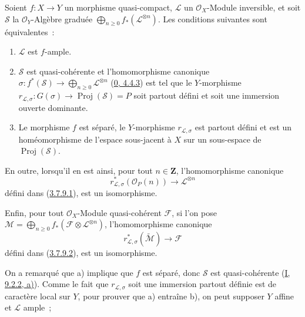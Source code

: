\begin{proposition}[4.6.3]
\label{II.4.6.3-fr}
Soient $f:X\to Y$ un morphisme quasi-compact, $\mathcal{L}$ un
$\mathcal{O}_X$-Module inversible, et soit $\mathcal{S}$ la
$\mathcal{O}_Y$-Algèbre graduée
$\bigoplus_{n\geq0}f_*(\mathcal{L}^{\otimes n})$. Les conditions suivantes
sont équivalentes~:
\begin{enumerate}
  \item[\rm{a)}] $\mathcal{L}$ est $f$-ample.
  \item[\rm{b)}] $\mathcal{S}$ est quasi-cohérente et l'homomorphisme
  canonique $\sigma:f^*(\mathcal{S})\to
  \bigoplus_{n\geq0}\mathcal{L}^{\otimes n}$
  (\hyperref[0.4.4.3-fr]{0, 4.4.3}) est tel que le $Y$-morphisme
  $r_{\mathcal{L},\sigma}:G(\sigma)\to\operatorname{Proj}(\mathcal{S})=P$
  soit partout défini et soit une immersion ouverte dominante.
  \item[\rm{b')}] Le morphisme $f$ est séparé, le $Y$-morphisme
  $r_{\mathcal{L},\sigma}$ est partout défini et est un homéomorphisme de
  l'espace sous-jacent à $X$ sur un sous-espace de
  $\operatorname{Proj}(\mathcal{S})$.
\end{enumerate}
En outre, lorsqu'il en est ainsi, pour tout $n\in\mathbf{Z}$,
l'homomorphisme canonique
\begin{equation}
\label{II.4.6.3.1-fr}
  r_{\mathcal{L},\sigma}^*(\mathcal{O}_P(n))
  \longrightarrow\mathcal{L}^{\otimes n}
\tag{4.6.3.1}
\end{equation}
défini dans (\hyperref[II.3.7.9.1-fr]{3.7.9.1}), est un isomorphisme.

Enfin, pour tout $\mathcal{O}_X$-Module quasi-cohérent $\mathcal{F}$, si
l'on pose
$\mathcal{M}=\bigoplus_{n\geq0}f_*(\mathcal{F}\otimes
\mathcal{L}^{\otimes n})$, l'homomorphisme canonique
\begin{equation}
\label{II.4.6.3.2-fr}
  r_{\mathcal{L},\sigma}^*(\widetilde{\mathcal{M}})
  \longrightarrow\mathcal{F}
\tag{4.6.3.2}
\end{equation}
défini dans (\hyperref[II.3.7.9.2-fr]{3.7.9.2}), est un isomorphisme.
\end{proposition}

On a remarqué que a) implique que $f$ est séparé, donc $\mathcal{S}$ est
quasi-cohérente (\hyperref[I.9.2.2-fr]{I, 9.2.2, a)}). Comme le fait que
$r_{\mathcal{L},\sigma}$ soit une immersion partout définie est de
caractère local sur $Y$, pour prouver que a) entraîne b), on peut supposer
$Y$ affine et $\mathcal{L}$ ample~;

